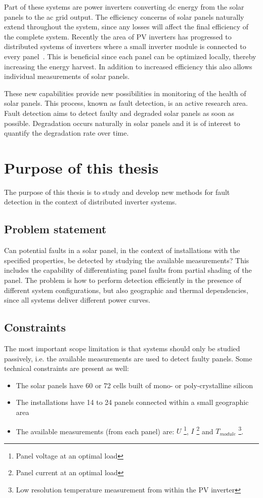 Part of these systems are power inverters converting dc energy from the solar panels to the ac grid output.
The efficiency concerns of solar panels naturally extend throughout the system, since any losses will affect the final efficiency of the complete system.
Recently the area of PV inverters has progressed to distributed systems of inverters where a small inverter module is connected to every panel~\cite{Roman2006}.
This is beneficial since each panel can be optimized locally, thereby increasing the energy harvest.
In addition to increased efficiency this also allows individual measurements of solar panels.

These new capabilities provide new possibilities in monitoring of the health of solar panels.
This process, known as fault detection, is an active research area.
Fault detection aims to detect faulty and degraded solar panels as soon as possible. 
Degradation occurs naturally in solar panels and it is of interest to quantify the degradation rate over time.

\section{Purpose of this thesis}
The purpose of this thesis is to study and develop new methods for fault detection in the context of distributed inverter systems.

\subsection*{Problem statement}
Can potential faults in a solar panel, in the context of installations with the specified properties, be detected by studying the available measurements?
This includes the capability of differentiating panel faults from partial shading of the panel.
The problem is how to perform detection efficiently in the presence of different system configurations, but also geographic and thermal dependencies, since all systems deliver different power curves.

\subsection*{Constraints}
The most important scope limitation is that systems should only be studied passively, i.e. the available measurements are used to detect faulty panels.  
Some technical constraints are present as well:
\begin{itemize}
\item The solar panels have 60 or 72 cells built of mono- or poly-crystalline silicon
\item The installations have 14 to 24 panels connected within a small geographic area
\item The available measurements (from each panel) are:
$U$ \footnote{Panel voltage at an optimal load},
$I$ \footnote{Panel current at an optimal load} and
$T_{module}$ \footnote{Low resolution temperature measurement from within the PV inverter}.

\end{itemize}

